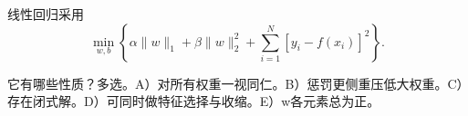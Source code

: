 线性回归采用
\[
\min_{w,b}\left\{\alpha\|w\|_1+\beta\|w\|_2^2+
\sum_{i=1}^N[y_i-f(x_i)]^2\right\}.
\]


它有哪些性质？多选。A）对所有权重一视同仁。B）惩罚更侧重压低大权重。C）存在闭式解。D）可同时做特征选择与收缩。E）w各元素总为正。
